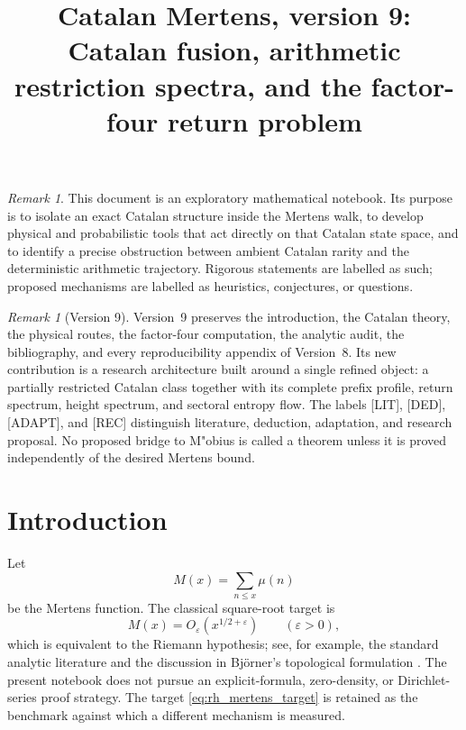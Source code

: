 \documentclass[11pt]{amsart}
\title[Catalan Mertens]{Catalan Mertens, version 9:\\Catalan fusion, arithmetic restriction spectra, and the factor-four return problem}
\author{}
\date{}
\numberwithin{equation}{section}
\theoremstyle{plain}
\theoremstyle{definition}
\theoremstyle{remark}
\newtheorem{remark}[theorem]{Remark}
\newcommand{\Mob}{\mu}
\newcommand{\Mert}{M}
\newcommand{\eps}{\varepsilon}
\begin{document}
\maketitle
\tableofcontents
\bigskip

\begin{remark}
\label{rem:exploratory_nature}
This document is an exploratory mathematical notebook.  Its purpose is to isolate an exact Catalan structure inside the Mertens walk, to develop physical and probabilistic tools that act directly on that Catalan state space, and to identify a precise obstruction between ambient Catalan rarity and the deterministic arithmetic trajectory.  Rigorous statements are labelled as such; proposed mechanisms are labelled as heuristics, conjectures, or questions.
\end{remark}

\begin{remark}[Version 9]
Version~9 preserves the introduction, the Catalan theory, the physical routes,
the factor-four computation, the analytic audit, the bibliography, and every
reproducibility appendix of Version~8.  Its new contribution is a research
architecture built around a single refined object: a partially restricted
Catalan class together with its complete prefix profile, return spectrum,
height spectrum, and sectoral entropy flow.  The labels \textup{[LIT]},
\textup{[DED]}, \textup{[ADAPT]}, and \textup{[REC]} distinguish literature,
deduction, adaptation, and research proposal.  No proposed bridge to M"obius
is called a theorem unless it is proved independently of the desired Mertens
bound.
\end{remark}

\section{Introduction}
\label{sec:introduction}

Let
\begin{equation}
\Mert(x)=\sum_{n\le x}\Mob(n)
\label{eq:mertens_definition}
\end{equation}
be the Mertens function.  The classical square-root target is
\begin{equation}
\Mert(x)=O_{\eps}\!\left(x^{1/2+\eps}\right)
\qquad (\eps>0),
\label{eq:rh_mertens_target}
\end{equation}
which is equivalent to the Riemann hypothesis; see, for example, the standard analytic literature and the discussion in Bj\"orner's topological formulation \cite{Bjorner2011}.  The present notebook does not pursue an explicit-formula, zero-density, or Dirichlet-series proof strategy.  The target \eqref{eq:rh_mertens_target} is retained as the benchmark against which a different mechanism is measured.
\end{document}
